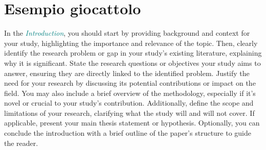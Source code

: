 \section{Esempio giocattolo}
\label{sec:esempio-giocattolo}


In the \textcolor{teal}{\textit{Introduction}}, you should start by providing background and context for your study, highlighting the importance and relevance of the topic. 
Then, clearly identify the research problem or gap in your study's existing literature, explaining why it is significant. 
State the research questions or objectives your study aims to answer, ensuring they are directly linked to the identified problem. 
Justify the need for your research by discussing its potential contributions or impact on the field.
You may also include a brief overview of the methodology, especially if it's novel or crucial to your study's contribution. 
Additionally, define the scope and limitations of your research, clarifying what the study will and will not cover.
If applicable, present your main thesis statement or hypothesis. 
Optionally, you can conclude the introduction with a brief outline of the paper's structure to guide the reader.